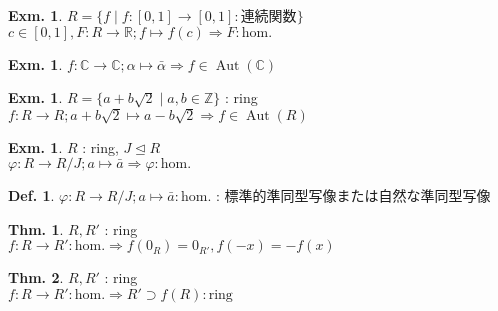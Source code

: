 \documentclass[uplatex,dvipdfmx,9pt]{beamer}
\newcommand{\Aut}[1]{\operatorname{Aut}(#1)}
\newcommand{\ideal}{\trianglelefteq}
\renewcommand{\hom}{\text{hom.}} %
\newcommand{\Z}{\mathbb{Z}}
\newcommand{\R}{\mathbb{R}}
\newcommand{\C}{\mathbb{C}}
\newcounter{textExmCount}
\theoremstyle{definition} %
\newtheorem{defn}{Def.}[subsection] %
\newtheorem{thm}{Thm.}[subsection] %
\theoremstyle{example}
\newtheorem{exmText}[textExmCount]{Exm.}
\begin{document}
    \begin{frame}

      \begin{exmText}
        $R = \{f \mid f\colon [0, 1] \to [0, 1] : \text{連続関数}\}$ \\
        $c \in [0, 1], F\colon R \to \R ; f \mapsto f(c) \Rightarrow F : \hom$
      \end{exmText}

      \begin{exmText}
        $f\colon \C \to \C ; \alpha \mapsto \bar{\alpha} \Rightarrow f \in \Aut{\C}$
      \end{exmText}

      \begin{exmText}
        $R = \{a + b\sqrt{2} \mid a, b \in \Z\}$ : ring \\
        $f\colon R \to R ; a + b\sqrt{2} \mapsto a - b\sqrt{2} \Rightarrow f \in \Aut{R}$
      \end{exmText}
      
    \end{frame}

    \begin{frame}

      \begin{exmText}
        $R$ : ring, $J \ideal R$ \\
        $\varphi \colon R \to R/J ; a \mapsto \bar{a} \Rightarrow \varphi : \hom$
      \end{exmText}

      \begin{defn}
        $\varphi \colon R \to R/J ; a \mapsto \bar{a} : \hom$ : \alert{標準的準同型写像}または\alert{自然な準同型写像}
      \end{defn}

      \begin{thm}
        $R, R'$ : ring \\
        $f\colon R \to R' : \hom \Rightarrow f(0_R) = 0_{R'}, f(-x) = -f(x)$
      \end{thm}

      \begin{thm}
        $R, R'$ : ring \\
        $f\colon R \to R' : \hom \Rightarrow R' \supset f(R) : \text{ring}$
      \end{thm}
      
    \end{frame}
\end{document}
